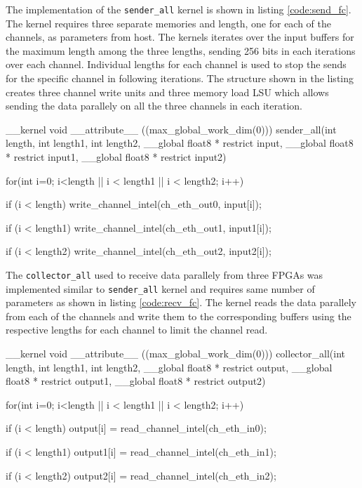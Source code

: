 The implementation of the \texttt{sender\_all} kernel is shown in listing \ref{code:send_fc}.
The kernel requires three separate memories and length, one for each of the channels, as
parameters from host. The kernels iterates over the input buffers for the maximum length
among the three lengths, sending 256 bits in each iterations over each channel. Individual
lengths for each channel is used to stop the sends for the specific channel in following
iterations. The structure shown in the listing creates three channel write units and three
memory load \ac{LSU} which allows sending the data parallely on all the three channels
in each iteration. 

\begin{CppCode} [caption=Sender Kernel for fully connected, frame=tlrb, label=code:send_fc]
__kernel void __attribute__ ((max_global_work_dim(0)))
sender_all(int length, int length1, int length2,
            __global float8 * restrict input,
            __global float8 * restrict input1,
            __global float8 * restrict input2)
{
    for(int i=0; i<length || i < length1 || i < length2; i++)
    {
        if (i < length)
            write_channel_intel(ch_eth_out0, input[i]);

        if (i < length1)
            write_channel_intel(ch_eth_out1, input1[i]);

        if (i < length2)
            write_channel_intel(ch_eth_out2, input2[i]);
    }
}
\end{CppCode}

The \texttt{collector\_all} used to receive data parallely from three FPGAs
was implemented similar to \texttt{sender\_all} kernel and requires same
number of parameters as shown in listing \ref{code:recv_fc}. The kernel
reads the data parallely from each of the channels and write them to the
corresponding buffers using the respective lengths for each channel
to limit the channel read.

\begin{CppCode} [caption=Collector Kernel for fully connected, frame=tlrb, label=code:recv_fc]
__kernel void __attribute__ ((max_global_work_dim(0)))
collector_all(int length, int length1, int length2,
            __global float8 * restrict output,
            __global float8 * restrict output1,
            __global float8 * restrict output2)
{
    for(int i=0; i<length || i < length1 || i < length2; i++)
    {
        if (i < length)
            output[i] = read_channel_intel(ch_eth_in0);

        if (i < length1)
            output1[i] = read_channel_intel(ch_eth_in1);
 
        if (i < length2)
            output2[i] = read_channel_intel(ch_eth_in2);
    }
}
\end{CppCode}

